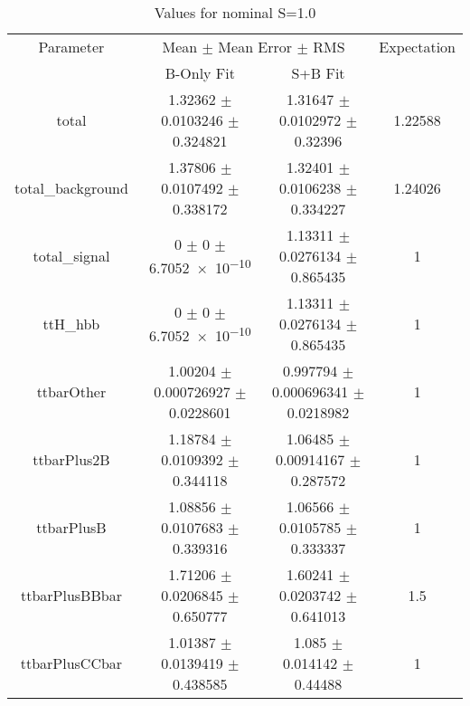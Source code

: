 \begin{table}
\centering
\caption{Values for nominal S=1.0}
\begin{tabular}{cccc}
\toprule
Parameter & \multicolumn{2}{c}{Mean $\pm$ Mean Error $\pm$ RMS} & Expectation\\
 & B-Only Fit & S+B Fit & \\
\midrule
total & \num{1.32362} $\pm$ \num{0.0103246} $\pm$ \num{0.324821} & \num{1.31647} $\pm$ \num{0.0102972} $\pm$ \num{0.32396} & \num{1.22588}\\
total\_background & \num{1.37806} $\pm$ \num{0.0107492} $\pm$ \num{0.338172} & \num{1.32401} $\pm$ \num{0.0106238} $\pm$ \num{0.334227} & \num{1.24026}\\
total\_signal & \num{0} $\pm$ \num{0} $\pm$ \num{6.7052e-10} & \num{1.13311} $\pm$ \num{0.0276134} $\pm$ \num{0.865435} & \num{1}\\
ttH\_hbb & \num{0} $\pm$ \num{0} $\pm$ \num{6.7052e-10} & \num{1.13311} $\pm$ \num{0.0276134} $\pm$ \num{0.865435} & \num{1}\\
ttbarOther & \num{1.00204} $\pm$ \num{0.000726927} $\pm$ \num{0.0228601} & \num{0.997794} $\pm$ \num{0.000696341} $\pm$ \num{0.0218982} & \num{1}\\
ttbarPlus2B & \num{1.18784} $\pm$ \num{0.0109392} $\pm$ \num{0.344118} & \num{1.06485} $\pm$ \num{0.00914167} $\pm$ \num{0.287572} & \num{1}\\
ttbarPlusB & \num{1.08856} $\pm$ \num{0.0107683} $\pm$ \num{0.339316} & \num{1.06566} $\pm$ \num{0.0105785} $\pm$ \num{0.333337} & \num{1}\\
ttbarPlusBBbar & \num{1.71206} $\pm$ \num{0.0206845} $\pm$ \num{0.650777} & \num{1.60241} $\pm$ \num{0.0203742} $\pm$ \num{0.641013} & \num{1.5}\\
ttbarPlusCCbar & \num{1.01387} $\pm$ \num{0.0139419} $\pm$ \num{0.438585} & \num{1.085} $\pm$ \num{0.014142} $\pm$ \num{0.44488} & \num{1}\\
\bottomrule
\end{tabular}
\end{table}